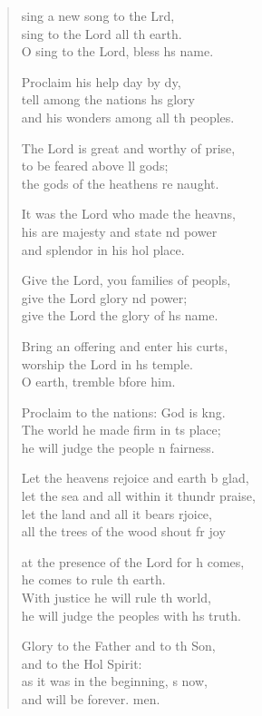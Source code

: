 \settowidth{\versewidth}{let the sea and all within it thunder praise,}
\begin{verse}%
  \begin{patverse}
 sing a new song to the Lrd,\Flex\\
sing to the Lord all th earth.\Med\\
O sing to the Lord, bless h\pointup{\i}s name.

Proclaim his help day by dy,\Flex\\
tell among the nations h\pointup{\i}s glory\Med\\
and his wonders among all th peoples.

The Lord is great and worthy of prise,\Flex\\
to be feared above ll gods;\Med\\
the gods of the heathens re naught.

It was the Lord who made the heavns,\Flex\\
his are majesty and state nd power\Med\\
and splendor in his hol place.

Give the Lord, you families of peopls,\Flex\\
give the Lord glory nd power;\Med\\
give the Lord the glory of h\pointup{\i}s name.

Bring an offering and enter his curts,\Flex\\
worship the Lord in h\pointup{\i}s temple.\Med\\
O earth, tremble bfore him.

Proclaim to the nations: God is k\pointup{\i}ng.\Flex\\
The world he made firm in \pointup{\i}ts place;\Med\\
he will judge the people \pointup{\i}n fairness.

Let the heavens rejoice and earth b glad,\Med\\
let the sea and all within it thundr praise,\\
let the land and all it bears rjoice,\Med\\
all the trees of the wood shout fr joy

at the presence of the Lord for h comes,\Med\\
he comes to rule th earth.\\
With justice he will rule th world,\Med\\
he will judge the peoples with h\pointup{\i}s truth.

Glory to the Father and to th Son,\Med\\
and to the Hol Spirit:\\
as it was in the beginning, \pointup{\i}s now,\Med\\
and will be forever. men. 
  \end{patverse}
\end{verse}
